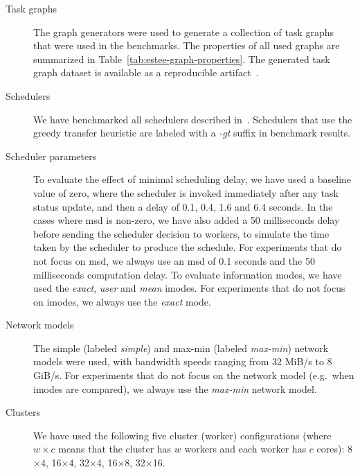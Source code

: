 \begin{description}
	\item[Task graphs] The \estee{} graph generators were used to generate a collection of task graphs that
		were used in the benchmarks. The properties of all used graphs are summarized in
		Table~\ref{tab:estee-graph-properties}. The generated task graph dataset is available as a reproducible
		artifact~\cite{estee_graphs}.
	\item[Schedulers] We have benchmarked all schedulers described in~. Schedulers that use the
		greedy transfer heuristic are labeled with a \emph{-gt} suffix in benchmark results.
	\item[Scheduler parameters] To evaluate the effect of minimal scheduling delay, we have used a baseline value of zero, where
		the scheduler is invoked immediately after any task status update, and then a delay of 0.1, 0.4,
		1.6 and 6.4 seconds. In the cases where \gls{msd} is non-zero, we have also added a 50
		milliseconds delay before sending the scheduler decision to workers, to simulate the time taken by
		the scheduler to produce the schedule. For experiments that do not focus on \gls{msd},
		we always use an \gls{msd} of 0.1 seconds and the 50 milliseconds computation delay.
		To evaluate information modes, we have used the \emph{exact}, \emph{user} and
		\emph{mean} imodes. For experiments that do not focus on imodes, we always use the
		\emph{exact} mode.
	\item[Network models] The simple (labeled \emph{simple}) and max-min (labeled \emph{max-min}) network
		models were used, with bandwidth speeds ranging from 32 MiB/s to 8 GiB/s. For experiments that do
		not focus on the network model (e.g.\ when imodes are compared), we always use the
		\emph{max-min} network model.
	\item[Clusters] We have used the following five cluster (worker) configurations (where $w \times c$ means
		that the cluster has $w$ workers and each worker has $c$
		cores):  8$\times$4, 16$\times$4, 32$\times$4,
		16$\times$8, 32$\times$16.
\end{description}

